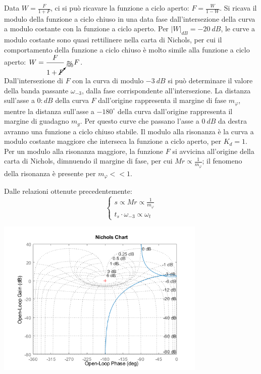 \documentclass{article}
\numberwithin{equation}{subsection}
\begin{document}
Data $W=\displaystyle\frac{F}{1+F}$, ci si può ricavare la funzione a ciclo aperto: $F=\displaystyle\frac{W}{1-W}$. Si ricava il modulo della funzione a ciclo chiuso in 
una data fase dall'intersezione della curva a modulo costante con la funzione a ciclo aperto. Per $|W|_{dB}=-20\:dB$, le curve a modulo costante sono quasi rettilinere nella 
carta di Nichols, per cui il comportamento della funzione a ciclo chiuso è molto simile alla funzione a ciclo aperto: 
$W=\displaystyle\frac{F}{1+\cancelto{\approx0}{F}}\approx F$. \\

Dall'intersezione di $F$ con la curva di modulo $-3\:dB$ si può determinare il valore della banda passante $\omega_{-3}$, dalla fase corrispondente all'intersezione. La 
distanza sull'asse a $0:dB$ della curva $F$ dall'origine rappresenta il margine di fase $m_{\varphi}$, mentre la distanza sull'asse a $-180^{\circ}$ della curva dall'origine 
rappresenta il margine di guadagno $m_g$. Per questo curve che passano l'asse a $0\:dB$ da destra avranno una funzione a ciclo chiuso stabile. Il modulo alla risonanza è la 
curva a modulo costante maggiore che interseca la funzione a ciclo aperto, per $K_d=1$. Per un modulo alla risonanza maggiore, la funzione $F$ si avvicina all'origine della 
carta di Nichols, dimnuendo il margine di fase, per cui $Mr\propto\displaystyle\frac{1}{m_{\varphi}}$; il fenomeno della risonanza è presente per $m_{\varphi}<<1$. 

Dalle relazioni ottenute precedentemente: 
\begin{equation}
    \begin{cases}
        s\propto Mr\propto\displaystyle\frac{1}{m_{\varphi}}\\
        t_s\cdot\omega_{-3}\propto\omega_t
    \end{cases}
\end{equation}

\begin{center}
    \includegraphics[width=10cm]{Nichols1.png}
\end{center}
\end{document}
